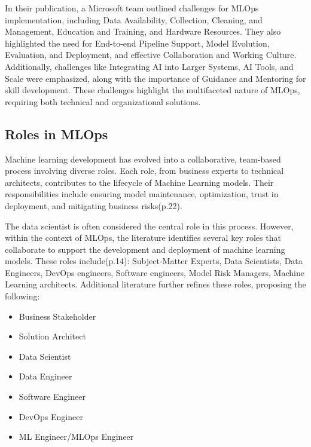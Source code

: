 In their publication, a Microsoft team\cite{8804457} outlined challenges for MLOps implementation, including Data Availability, Collection, Cleaning, and Management,
Education and Training, and Hardware Resources.
They also highlighted the need for End-to-end Pipeline Support, Model Evolution, Evaluation, and Deployment, and effective Collaboration and Working Culture.
Additionally, challenges like Integrating AI into Larger Systems, AI Tools, and Scale were emphasized,
along with the importance of Guidance and Mentoring for skill development.
These challenges highlight the multifaceted nature of MLOps, requiring both technical and organizational solutions.

\subsection{Roles in MLOps}\label{subsec:actors}

Machine learning development has evolved into a collaborative, team-based process involving diverse roles.
Each role, from business experts to technical architects, contributes to the lifecycle of Machine Learning models.
Their responsibilities include ensuring model maintenance, optimization, trust in deployment,
and mitigating business risks\cite{treveil2020introducing}(p.22).

The data scientist is often considered the central role in this process.
However, within the context of MLOps, the literature identifies several key roles that
collaborate to support the development and deployment of machine learning models.
These roles include\cite{treveil2020introducing}(p.14):
Subject-Matter Experts, Data Scientists, Data Engineers, DevOps engineers, Software engineers, Model Risk Managers, Machine Learning architects.
Additional literature further refines these roles, proposing the following\cite{Kreuzberger2022MachineLO}:

\begin{itemize}
    \item Business Stakeholder
    \item Solution Architect
    \item Data Scientist
    \item Data Engineer
    \item Software Engineer
    \item DevOps Engineer
    \item ML Engineer/MLOps Engineer
\end{itemize}

